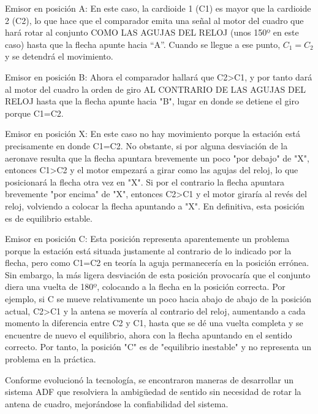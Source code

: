 \begin{description}
\item {Emisor en posici\'on A:} En este caso, la cardioide 1 (C1) es mayor que la cardioide 2 (C2), lo que hace que el comparador emita una se\~nal al motor del cuadro que har\'a rotar al conjunto COMO LAS AGUJAS DEL RELOJ (unos 150º en este caso) hasta que la flecha apunte hacia ``A''. Cuando se llegue a ese punto, $C_1=C_2$ y se detendr\'a el movimiento.


\item Emisor en posici\'on B: Ahora el comparador hallar\'a que C2>C1, y por tanto dar\'a al motor del cuadro la orden de giro AL CONTRARIO DE LAS AGUJAS DEL RELOJ hasta que la flecha apunte hacia "B", lugar en donde se detiene el giro porque C1=C2.
    

\item Emisor en posici\'on X: En este caso no hay movimiento porque la estaci\'on est\'a precisamente en donde C1=C2. No obstante, si por alguna desviaci\'on de la aeronave resulta que la flecha apuntara brevemente un poco "por debajo" de "X", entonces C1>C2 y el motor empezar\'a a girar como las agujas del reloj, lo que posicionar\'a la flecha otra vez en "X". Si por el contrario la flecha apuntara brevemente "por encima" de "X", entonces C2>C1 y el motor girar\'ia al rev\'es del reloj, volviendo a colocar la flecha apuntando a "X". En definitiva, esta posici\'on es de equilibrio estable.


\item Emisor en posici\'on C: Esta posici\'on representa aparentemente un problema porque la estaci\'on est\'a situada justamente al contrario de lo indicado por la flecha, pero como C1=C2 en teor\'ia la aguja permanecer\'ia en la posici\'on err\'onea. Sin embargo, la m\'as ligera desviaci\'on de esta posici\'on provocar\'ia que el conjunto diera una vuelta de 180º, colocando a la flecha en la posici\'on correcta. Por ejemplo, si C se mueve relativamente un poco hacia abajo de abajo de la posici\'on actual, C2>C1 y la antena se mover\'ia al contrario del reloj, aumentando a cada momento la diferencia entre C2 y C1, hasta que se d\'e una vuelta completa y se encuentre de nuevo el equilibrio, ahora con la flecha apuntando en el sentido correcto. Por tanto, la posici\'on "C" es de "equilibrio inestable" y no representa un problema en la pr\'actica.
 
\end{description}
    

Conforme evolucion\'o la tecnolog\'ia, se encontraron maneras de desarrollar un sistema ADF que resolviera la ambigüedad de sentido sin necesidad de rotar la antena de cuadro, mejor\'andose la confiabilidad del sistema.

